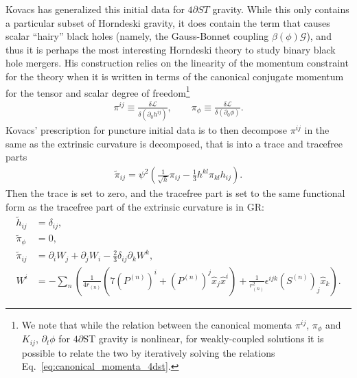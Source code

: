 \documentclass{ws-ijmpd}
\begin{document}
Kovacs\cite{Kovacs:2021lgk} has generalized this
initial data for $4\partial ST$ gravity. While this only contains
a particular subset of Horndeski gravity, it does contain the term
that causes scalar ``hairy'' black holes (namely, the
Gauss-Bonnet coupling $\beta\left(\phi\right)\mathcal{G}$),
and thus it is perhaps the most interesting Horndeski theory to study
binary black hole mergers.
His construction relies on the linearity of the momentum
constraint for the theory when it is written in terms of the
canonical conjugate momentum for the tensor and scalar
degree of freedom\footnote{We note
that while the relation between the canonical momenta
$\pi^{ij}$, $\pi_{\phi}$
and $K_{ij}$, $\partial_t\phi$ for $4\partial$ST gravity
is nonlinear\cite{Julie:2020vov}, for weakly-coupled solutions it is
possible to relate the two by iteratively solving the
relations 
Eq.~\eqref{eq:canonical_momenta_4dst}\cite{Kovacs:2021lgk}.}
\cite{Julie:2020vov,Kovacs:2021lgk}
\begin{align}
\label{eq:canonical_momenta_4dst}
   \pi^{ij}
   \equiv
   \frac{\delta\mathcal{L}}{\delta\left(\partial_0h^{ij}\right)}
   ,\qquad
   \pi_{\phi}
   \equiv
   \frac{\delta\mathcal{L}}{\delta\left(\partial_0\phi\right)}
   .
\end{align}
Kovacs' prescription for puncture initial data is to
then decompose $\pi^{ij}$ in the same as the extrinsic curvature is
decomposed, that is into a trace and tracefree parts
\begin{align}
   \tilde{\pi}_{ij}
   =
   \psi^2\left(
      \frac{1}{\sqrt{h}}\pi_{ij}
      -
      \frac{1}{3}h^{kl}\pi_{kl}
      h_{ij}
   \right)
   .
\end{align}
Then the trace is set to zero, and the tracefree part is
set to the same functional form as the tracefree part of the extrinsic
curvature is in GR:
\begin{subequations}
\begin{align}
   \tilde{h}_{ij}
   &=
   \delta_{ij}
   ,\\
   \tilde{\pi}_{\phi}
   &=
   0
   ,\\
   \tilde{\pi}_{ij}
   &=
   \partial_iW_j
   +
   \partial_jW_i
   -
   \frac{2}{3}\delta_{ij}\partial_kW^k
   ,\\
   W^i
   &=
   -
   \sum_n
      \left(
         \frac{1}{4r_{(n)}}\left(
            7\left(P^{(n)}\right)^i 
            + 
            \left(P^{(n)}\right)^j\hat{x}_j \hat{x}^i
         \right)
         +
         \frac{1}{r_{(n)}^2}\epsilon^{ijk}\left(S^{(n)}\right)_j\hat{x}_k
      \right)
   .
\end{align}
\end{subequations}
\end{document}
